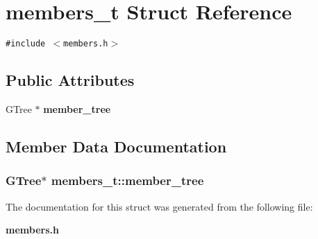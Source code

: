 \section{members\_\-t Struct Reference}
\label{structmembers__t}
{\tt \#include $<$members.h$>$}

\subsection*{Public Attributes}
\begin{CompactItemize}
\item 
GTree $\ast$ {\bf member\_\-tree}
\end{CompactItemize}


\subsection{Member Data Documentation}
\subsubsection{\setlength{\rightskip}{0pt plus 5cm}GTree$\ast$ {\bf members\_\-t::member\_\-tree}}\label{structmembers__t_o0}




The documentation for this struct was generated from the following file:\begin{CompactItemize}
\item 
{\bf members.h}\end{CompactItemize}
